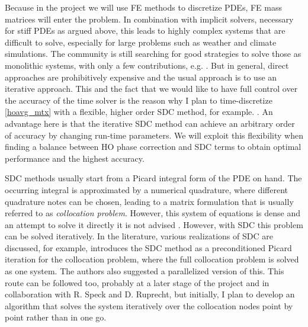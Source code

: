 \documentclass[a4,12pt]{article}
\begin{document}
Because in the project we will use FE methods to discretize PDEs, FE mass matrices will enter the problem. In combination with implicit solvers, necessary for stiff PDEs as argued above, this leads to highly complex systems that are difficult to solve, especially for large problems such as weather and climate simulations.
The community is still searching for good strategies to solve those as monolithic systems, with only a few contributions, e.g. \cite{colinjemma2023}. But in general, direct approaches are prohibitively expensive and the usual approach is to use an iterative approach. This and the fact that we would like to have full control over the accuracy of the time solver is the reason why I plan to time-discretize \eqref{hoavg_mtx} with a flexible, higher order SDC method, for example.  \cite{Dutt2000, ruprecht2016,Speck18}. An advantage here is that the iterative SDC method can achieve an arbitrary order of accuracy by changing run-time parameters. We will exploit this flexibility when finding a balance between HO phase correction and SDC terms to obtain optimal performance and the highest accuracy.


SDC methods usually start from a Picard integral form of the PDE on hand. The occurring integral is approximated by a numerical quadrature, where different quadrature notes can be chosen, leading to a matrix formulation that is usually referred to as \emph{collocation problem}. However, this system of equations is dense and an attempt to solve it directly it is not advised \cite{Speck18}. However, with SDC this problem can be solved iteratively. In the literature, various realizations of SDC are discussed, for example, \cite{Speck18} introduces the SDC method as a preconditioned Picard iteration for the collocation problem, where the full collocation problem is solved as one system. The authors also suggested a parallelized version of this. This route can be followed too, probably at a later stage of the project and in collaboration with R. Speck and D. Ruprecht, but initially, I plan to develop an algorithm that solves the system iteratively over the collocation nodes point by point rather than in one go.
\end{document}
